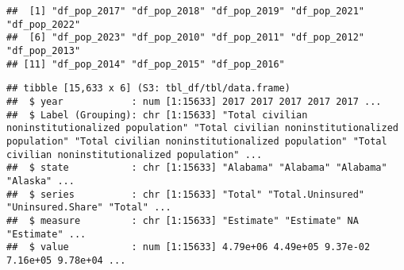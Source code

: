 \documentclass[
]{article}
\newenvironment{Shaded}{\begin{snugshade}}{\end{snugshade}}
\newcommand{\CommentTok}[1]{\textcolor[rgb]{0.56,0.35,0.01}{\textit{#1}}}
\newcommand{\DocumentationTok}[1]{\textcolor[rgb]{0.56,0.35,0.01}{\textbf{\textit{#1}}}}
\newcommand{\FunctionTok}[1]{\textcolor[rgb]{0.13,0.29,0.53}{\textbf{#1}}}
\newcommand{\NormalTok}[1]{#1}
\newcommand{\OtherTok}[1]{\textcolor[rgb]{0.56,0.35,0.01}{#1}}
\newcommand{\SpecialCharTok}[1]{\textcolor[rgb]{0.81,0.36,0.00}{\textbf{#1}}}
\newcommand{\StringTok}[1]{\textcolor[rgb]{0.31,0.60,0.02}{#1}}
\begin{document}
\begin{Shaded}
\end{Shaded}

\begin{verbatim}
##  [1] "df_pop_2017" "df_pop_2018" "df_pop_2019" "df_pop_2021" "df_pop_2022"
##  [6] "df_pop_2023" "df_pop_2010" "df_pop_2011" "df_pop_2012" "df_pop_2013"
## [11] "df_pop_2014" "df_pop_2015" "df_pop_2016"
\end{verbatim}

\begin{Shaded}
\end{Shaded}

\begin{verbatim}
## tibble [15,633 x 6] (S3: tbl_df/tbl/data.frame)
##  $ year            : num [1:15633] 2017 2017 2017 2017 2017 ...
##  $ Label (Grouping): chr [1:15633] "Total civilian noninstitutionalized population" "Total civilian noninstitutionalized population" "Total civilian noninstitutionalized population" "Total civilian noninstitutionalized population" ...
##  $ state           : chr [1:15633] "Alabama" "Alabama" "Alabama" "Alaska" ...
##  $ series          : chr [1:15633] "Total" "Total.Uninsured" "Uninsured.Share" "Total" ...
##  $ measure         : chr [1:15633] "Estimate" "Estimate" NA "Estimate" ...
##  $ value           : num [1:15633] 4.79e+06 4.49e+05 9.37e-02 7.16e+05 9.78e+04 ...
\end{verbatim}
\end{document}
